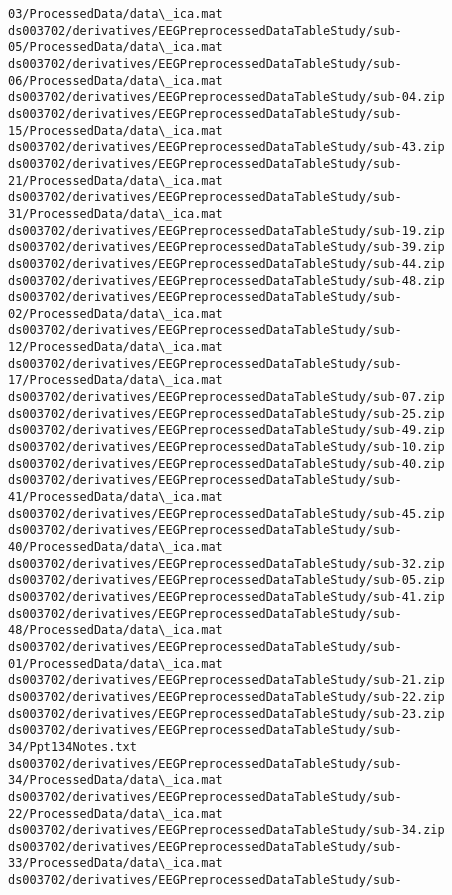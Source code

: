 \documentclass[11pt]{article}
\begin{document}
\begin{Verbatim}[commandchars=\\\{\}]
03/ProcessedData/data\_ica.mat
ds003702/derivatives/EEGPreprocessedDataTableStudy/sub-
05/ProcessedData/data\_ica.mat
ds003702/derivatives/EEGPreprocessedDataTableStudy/sub-
06/ProcessedData/data\_ica.mat
ds003702/derivatives/EEGPreprocessedDataTableStudy/sub-04.zip
ds003702/derivatives/EEGPreprocessedDataTableStudy/sub-
15/ProcessedData/data\_ica.mat
ds003702/derivatives/EEGPreprocessedDataTableStudy/sub-43.zip
ds003702/derivatives/EEGPreprocessedDataTableStudy/sub-
21/ProcessedData/data\_ica.mat
ds003702/derivatives/EEGPreprocessedDataTableStudy/sub-
31/ProcessedData/data\_ica.mat
ds003702/derivatives/EEGPreprocessedDataTableStudy/sub-19.zip
ds003702/derivatives/EEGPreprocessedDataTableStudy/sub-39.zip
ds003702/derivatives/EEGPreprocessedDataTableStudy/sub-44.zip
ds003702/derivatives/EEGPreprocessedDataTableStudy/sub-48.zip
ds003702/derivatives/EEGPreprocessedDataTableStudy/sub-
02/ProcessedData/data\_ica.mat
ds003702/derivatives/EEGPreprocessedDataTableStudy/sub-
12/ProcessedData/data\_ica.mat
ds003702/derivatives/EEGPreprocessedDataTableStudy/sub-
17/ProcessedData/data\_ica.mat
ds003702/derivatives/EEGPreprocessedDataTableStudy/sub-07.zip
ds003702/derivatives/EEGPreprocessedDataTableStudy/sub-25.zip
ds003702/derivatives/EEGPreprocessedDataTableStudy/sub-49.zip
ds003702/derivatives/EEGPreprocessedDataTableStudy/sub-10.zip
ds003702/derivatives/EEGPreprocessedDataTableStudy/sub-40.zip
ds003702/derivatives/EEGPreprocessedDataTableStudy/sub-
41/ProcessedData/data\_ica.mat
ds003702/derivatives/EEGPreprocessedDataTableStudy/sub-45.zip
ds003702/derivatives/EEGPreprocessedDataTableStudy/sub-
40/ProcessedData/data\_ica.mat
ds003702/derivatives/EEGPreprocessedDataTableStudy/sub-32.zip
ds003702/derivatives/EEGPreprocessedDataTableStudy/sub-05.zip
ds003702/derivatives/EEGPreprocessedDataTableStudy/sub-41.zip
ds003702/derivatives/EEGPreprocessedDataTableStudy/sub-
48/ProcessedData/data\_ica.mat
ds003702/derivatives/EEGPreprocessedDataTableStudy/sub-
01/ProcessedData/data\_ica.mat
ds003702/derivatives/EEGPreprocessedDataTableStudy/sub-21.zip
ds003702/derivatives/EEGPreprocessedDataTableStudy/sub-22.zip
ds003702/derivatives/EEGPreprocessedDataTableStudy/sub-23.zip
ds003702/derivatives/EEGPreprocessedDataTableStudy/sub-
34/Ppt134Notes.txt
ds003702/derivatives/EEGPreprocessedDataTableStudy/sub-
34/ProcessedData/data\_ica.mat
ds003702/derivatives/EEGPreprocessedDataTableStudy/sub-
22/ProcessedData/data\_ica.mat
ds003702/derivatives/EEGPreprocessedDataTableStudy/sub-34.zip
ds003702/derivatives/EEGPreprocessedDataTableStudy/sub-
33/ProcessedData/data\_ica.mat
ds003702/derivatives/EEGPreprocessedDataTableStudy/sub-

\end{Verbatim}
\end{document}

